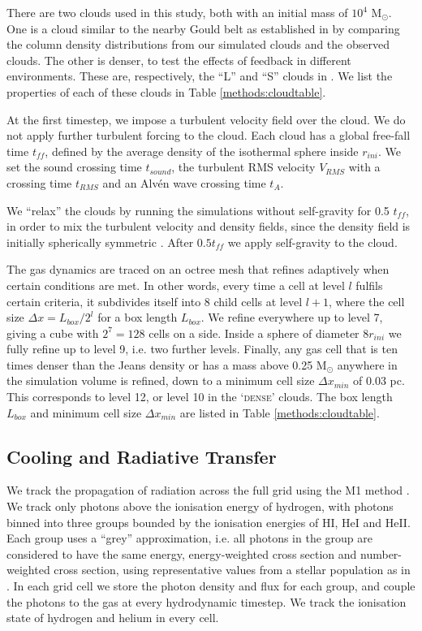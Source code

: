 \documentclass[a4paper,fleqn,usenatbib]{mnras}
\newcommand{\Msolar}{M$_{\odot}$\xspace}
\begin{document}
There are two clouds used in this study, both with an initial mass of $10^4$ \Msolar. One is a cloud similar to the nearby Gould belt as established in \cite{Geen2017} by comparing the column density distributions from our simulated clouds and the observed clouds. The other is denser, to test the effects of feedback in different environments. These are, respectively, the ``L'' and ``S'' clouds in \cite{Geen2017}. We list the properties of each of these clouds in Table \ref{methods:cloudtable}.

At the first timestep, we impose a turbulent velocity field over the cloud. We do not apply further turbulent forcing to the cloud. Each cloud has a global free-fall time $t_{ff}$, defined by the average density of the isothermal sphere inside $r_{ini}$. We set the sound crossing time $t_{sound}$, the turbulent RMS velocity $V_{RMS}$ with a crossing time $t_{RMS}$ and an Alv\'en wave crossing time $t_{A}$.

We ``relax'' the clouds by running the simulations without self-gravity for 0.5 $t_{ff}$, in order to mix the turbulent velocity and density fields, since the density field is initially spherically symmetric \citep[see][amongst others]{Klessen2000,Lee2016a}. After $0.5 t_{ff}$ we apply self-gravity to the cloud.

The gas dynamics are traced on an octree mesh that refines adaptively when certain conditions are met. In other words, every time a cell at level $l$ fulfils certain criteria, it subdivides itself into 8 child cells at level $l+1$, where the cell size $\Delta x = L_{box} / 2^l$ for a box length $L_{box}$. We refine everywhere up to level 7, giving a cube with $2^7=128$ cells on a side. Inside a sphere of diameter $8 r_{ini}$ we fully refine up to level 9, i.e. two further levels. Finally, any gas cell that is ten times denser than the Jeans density or has a mass above 0.25 \Msolar anywhere in the simulation volume is refined, down to a minimum cell size $\Delta x_{min}$ of 0.03 pc. This corresponds to level 12, or level 10 in the `\textsc{dense}' clouds. The box length $L_{box}$ and minimum cell size $\Delta x_{min}$ are listed in Table \ref{methods:cloudtable}.

\subsection{Cooling and Radiative Transfer}
\label{methods:cooling}

We track the propagation of radiation across the full \AMR grid using the M1 method \citep{Rosdahl2013}. We track only photons above the ionisation energy of hydrogen, with photons binned into three groups bounded by the ionisation energies of HI, HeI and HeII. Each group uses a ``grey'' approximation, i.e. all photons in the group are considered to have the same energy, energy-weighted cross section and number-weighted cross section, using representative values from a stellar population as in \citet{Geen2017}. In each grid cell we store the photon density and flux for each group, and couple the photons to the gas at every hydrodynamic timestep. We track the ionisation state of hydrogen and helium in every \AMR cell.
\end{document}
